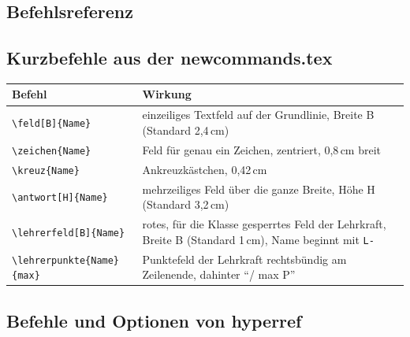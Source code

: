 \begin{Form}
\section{Befehlsreferenz}

\subsection{Kurzbefehle aus der newcommands.tex}

\renewcommand{\arraystretch}{1.3}
\begin{tabular}{p{5.6cm} p{10cm}}
	\toprule
	\textbf{Befehl} & \textbf{Wirkung} \\
	\midrule
	\verb|\feld[B]{Name}| & einzeiliges Textfeld auf der Grundlinie, Breite B (Standard 2,4\,cm) \\
	\verb|\zeichen{Name}| & Feld für genau ein Zeichen, zentriert, 0,8\,cm breit \\
	\verb|\kreuz{Name}| & Ankreuzkästchen, 0,42\,cm \\
	\verb|\antwort[H]{Name}| & mehrzeiliges Feld über die ganze Breite, Höhe H (Standard 3,2\,cm) \\
	\verb|\lehrerfeld[B]{Name}| & rotes, für die Klasse gesperrtes Feld der Lehrkraft, Breite B (Standard 1\,cm), Name beginnt mit \texttt{L-} \\
	\verb|\lehrerpunkte{Name}{max}| & Punktefeld der Lehrkraft rechtsbündig am Zeilenende, dahinter \enquote{/ max P} \\
	\bottomrule
\end{tabular}

\subsection{Befehle und Optionen von hyperref}


\end{Form}
